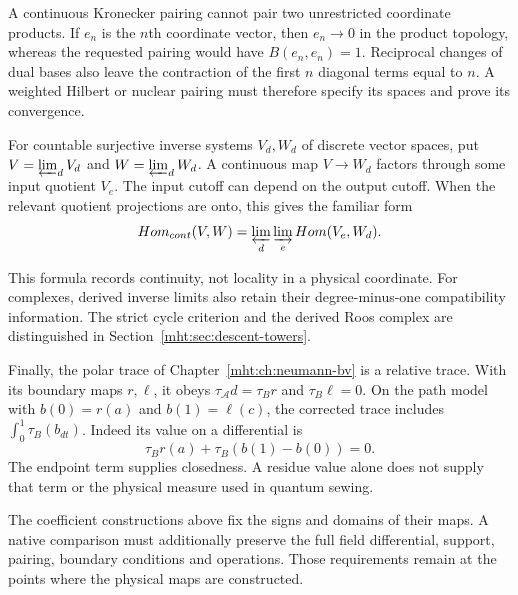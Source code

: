 A continuous Kronecker pairing cannot pair two unrestricted
coordinate products. If $e_n$ is the $n$th coordinate vector,
then $e_n\to0$ in the product topology, whereas the requested
pairing would have $B(e_n,e_n)=1$. Reciprocal changes of dual
bases also leave the contraction of the first $n$ diagonal
terms equal to $n$. A weighted Hilbert or nuclear pairing
must therefore specify its spaces and prove its convergence.

For countable surjective inverse systems $V_d,W_d$ of discrete
vector spaces, put $V=\varprojlim_dV_d$ and
$W=\varprojlim_dW_d$. A continuous map $V\to W_d$ factors
through some input quotient $V_e$. The input cutoff can depend
on the output cutoff. When the relevant quotient projections
are onto, this gives the familiar form
\[
 \operatorname{Hom}_{\mathrm{cont}}(V,W)
   =\varprojlim_d\varinjlim_e\operatorname{Hom}(V_e,W_d).
\]

This formula records continuity, not locality in a physical
coordinate. For complexes, derived inverse limits also retain
their degree-minus-one compatibility information. The strict
cycle criterion and the derived Roos complex are distinguished
in Section~\ref{mht:sec:descent-towers}.

Finally, the polar trace of Chapter~\ref{mht:ch:neumann-bv}
is a relative trace. With its boundary maps $r,\ell$, it obeys
$\tau_{\mathcal A}d=\tau_Br$ and $\tau_B\ell=0$.
On the path model with $b(0)=r(a)$ and $b(1)=\ell(c)$,
the corrected trace includes $\int_0^1\tau_B(b_{dt})$.
Indeed its value on a differential is
\[
 \tau_Br(a)+\tau_B(b(1)-b(0))=0.
\]
The endpoint term supplies closedness. A residue value alone
does not supply that term or the physical measure used in
quantum sewing.

The coefficient constructions above fix the signs and domains
of their maps. A native comparison must additionally preserve
the full field differential, support, pairing, boundary
conditions and operations. Those requirements remain at the
points where the physical maps are constructed.
